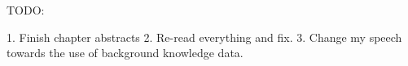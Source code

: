 TODO:

1. Finish chapter abstracts
2. Re-read everything and fix.
3. Change my speech towards the use of background knowledge data.
 